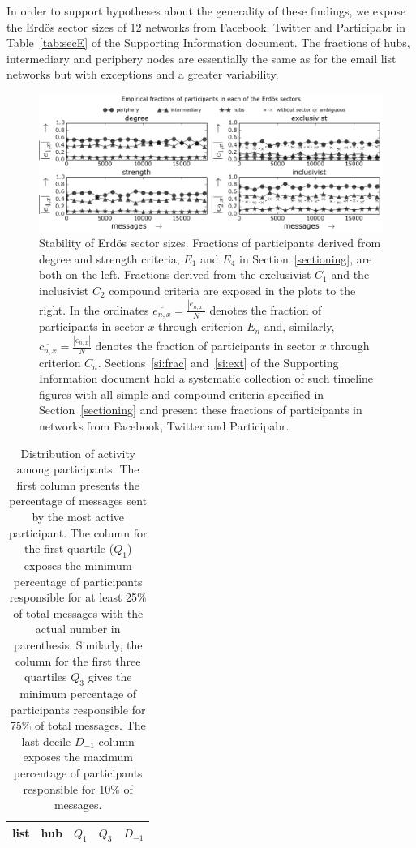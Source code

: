 \documentclass[%
	aip,
	jmp,%
	amsmath,amssymb,
	reprint,%
]{revtex4-1}
\begin{document}
In order to support hypotheses about the generality of these findings,
we expose the Erd\"os sector sizes of 12 networks from Facebook, Twitter and Participabr
in Table~\ref{tab:secE} of the Supporting Information document.
The fractions of hubs, intermediary and periphery nodes are
essentially the same as for the email list networks but with exceptions and a greater variability.

\begin{figure} 
	\centering
	\includegraphics[width=\textwidth]{figs/InText-WLAU-S1000_}
	\caption{Stability of Erd\"os sector sizes.
		Fractions of participants derived from degree and strength criteria, $E_1$ and $E_4$ in Section~\ref{sectioning}, are both on the left.
	Fractions derived from the exclusivist $C_1$ and the inclusivist $C_2$ compound criteria are exposed in the plots to the right.
	In the ordinates $\overline{e_{n,x}}=\frac{|e_{n,x}|}{N}$ denotes the fraction of participants in sector $x$ through criterion $E_n$
	and, similarly, $\overline{c_{n,x}}=\frac{|c_{n,x}|}{N}$ denotes the fraction of participants in sector $x$ through criterion $C_n$.
Sections~\ref{si:frac} and~\ref{si:ext} of the Supporting Information document hold a systematic collection of such timeline figures with all simple and compound criteria specified in Section~\ref{sectioning} and present these fractions of participants in networks from Facebook, Twitter and Participabr.}
	\label{fig:sectIL}
\end{figure}


\begin{table}[h]
	\caption{Distribution of activity among participants.
The first column presents the percentage of messages sent by the most active participant.
The column for the first quartile ($Q_1$) exposes 
the minimum percentage of participants
responsible for at least 25\% of total messages with the actual number in parenthesis.
Similarly, the column for the first three quartiles $Q_3$
gives the minimum percentage of participants responsible for 75\% of total messages.
The last decile $D_{-1}$ column exposes the maximum percentage of participants responsible for 10\% of messages.}
	\begin{center}
		\begin{tabular}{ | l ||  c | c | c | c | }
			\hline
			list & hub & $ Q_1 $ & $ Q_3 $ & $D_{-1}$ \\ \hline
			
		\end{tabular}
	\end{center}
	\label{autores}
\end{table}
\end{document}
